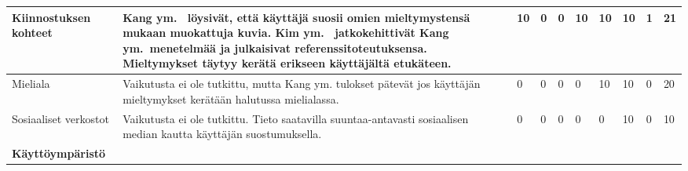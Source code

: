 \documentclass[finnish, 12pt, a4paper, elec, utf8, a-1b, online]{aaltothesis}
\begin{document}
{\begin{longtable}{p{2.5cm}|p{6cm}|p{0.5cm}p{0.5cm}p{0.5cm}|p{0.5cm}|p{0.5cm}p{0.5cm}p{0.5cm}|p{0.5cm}|}
        \midrule
        Kiinnostuksen kohteet                  & Kang ym.~\cite{5539850} löysivät, että käyttäjä suosii omien mieltymystensä mukaan muokattuja kuvia. Kim ym.~\cite{10.1007/978-3-030-58577-8_23} jatkokehittivät Kang ym.~menetelmää ja julkaisivat referenssitoteutuksensa. Mieltymykset täytyy kerätä erikseen käyttäjältä etukäteen.                                                                                   & 10                                         & 0                                   & 0                                      & 10                           & 10                                              & 10                                        & 1                                         & 21                           \\
        \midrule
        Mieliala                               & Vaikutusta ei ole tutkittu, mutta Kang ym.\cite{5539850} tulokset pätevät jos käyttäjän mieltymykset kerätään halutussa mielialassa.                                                                                                                                                                                                                                      & 0                                          & 0                                   & 0                                      & 0                            & 10                                              & 10                                        & 0                                         & 20                           \\
        \midrule
        Sosiaaliset verkostot                  & Vaikutusta ei ole tutkittu. Tieto saatavilla suuntaa-antavasti sosiaalisen median kautta käyttäjän suostumuksella.                                                                                                                                                                                                                                                        & 0                                          & 0                                   & 0                                      & 0                            & 0                                               & 10                                        & 0                                         & 10                           \\
        \midrule
        \textbf{Käyttöympäristö}                                                                                                                                                                                                                                                                                                                                                                                                                                                                                                                                                                                                                                                                                                                               \\

\end{longtable}}
\end{document}
